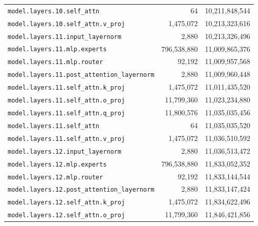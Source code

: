 \documentclass[10pt,a4paper]{article}
\theoremstyle{definition}
\begin{document}
\begin{appendices}
\begin{longtable}{p{9.5cm}rr}
\texttt{model.\allowbreak{}layers.\allowbreak{}10.\allowbreak{}self\_attn} & 64 & 10,211,848,544 \\
\texttt{model.\allowbreak{}layers.\allowbreak{}10.\allowbreak{}self\_attn.\allowbreak{}v\_proj} & 1,475,072 & 10,213,323,616 \\
\texttt{model.\allowbreak{}layers.\allowbreak{}11.\allowbreak{}input\_layernorm} & 2,880 & 10,213,326,496 \\
\texttt{model.\allowbreak{}layers.\allowbreak{}11.\allowbreak{}mlp.\allowbreak{}experts} & 796,538,880 & 11,009,865,376 \\
\texttt{model.\allowbreak{}layers.\allowbreak{}11.\allowbreak{}mlp.\allowbreak{}router} & 92,192 & 11,009,957,568 \\
\texttt{model.\allowbreak{}layers.\allowbreak{}11.\allowbreak{}post\_attention\_layernorm} & 2,880 & 11,009,960,448 \\
\texttt{model.\allowbreak{}layers.\allowbreak{}11.\allowbreak{}self\_attn.\allowbreak{}k\_proj} & 1,475,072 & 11,011,435,520 \\
\texttt{model.\allowbreak{}layers.\allowbreak{}11.\allowbreak{}self\_attn.\allowbreak{}o\_proj} & 11,799,360 & 11,023,234,880 \\
\texttt{model.\allowbreak{}layers.\allowbreak{}11.\allowbreak{}self\_attn.\allowbreak{}q\_proj} & 11,800,576 & 11,035,035,456 \\
\texttt{model.\allowbreak{}layers.\allowbreak{}11.\allowbreak{}self\_attn} & 64 & 11,035,035,520 \\
\texttt{model.\allowbreak{}layers.\allowbreak{}11.\allowbreak{}self\_attn.\allowbreak{}v\_proj} & 1,475,072 & 11,036,510,592 \\
\texttt{model.\allowbreak{}layers.\allowbreak{}12.\allowbreak{}input\_layernorm} & 2,880 & 11,036,513,472 \\
\texttt{model.\allowbreak{}layers.\allowbreak{}12.\allowbreak{}mlp.\allowbreak{}experts} & 796,538,880 & 11,833,052,352 \\
\texttt{model.\allowbreak{}layers.\allowbreak{}12.\allowbreak{}mlp.\allowbreak{}router} & 92,192 & 11,833,144,544 \\
\texttt{model.\allowbreak{}layers.\allowbreak{}12.\allowbreak{}post\_attention\_layernorm} & 2,880 & 11,833,147,424 \\
\texttt{model.\allowbreak{}layers.\allowbreak{}12.\allowbreak{}self\_attn.\allowbreak{}k\_proj} & 1,475,072 & 11,834,622,496 \\
\texttt{model.\allowbreak{}layers.\allowbreak{}12.\allowbreak{}self\_attn.\allowbreak{}o\_proj} & 11,799,360 & 11,846,421,856 \\

\end{longtable}
\end{appendices}
\end{document}
